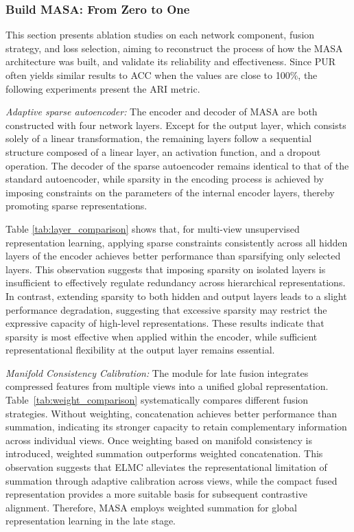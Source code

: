 \documentclass[10pt, journal, compsoc]{IEEEtran}
\begin{document}

\subsubsection{Build MASA: From Zero to One}
This section presents ablation studies on each network component, fusion strategy, and loss selection, aiming to reconstruct the process of how the MASA architecture was built, and validate its reliability and effectiveness. Since PUR often yields similar results to ACC when the values are close to 100\%, the following experiments present the ARI metric.

\textcolor{c1}{\textit{Adaptive sparse autoencoder:}} The encoder and decoder of MASA are both constructed with four network layers. Except for the output layer, which consists solely of a linear transformation, the remaining layers follow a sequential structure composed of a linear layer, an activation function, and a dropout operation. The decoder of the sparse autoencoder remains identical to that of the standard autoencoder, while sparsity in the encoding process is achieved by imposing constraints on the parameters of the internal encoder layers, thereby promoting sparse representations.


Table \ref{tab:layer_comparison} shows that, for multi-view unsupervised representation learning, applying sparse constraints consistently across all hidden layers of the encoder achieves better performance than sparsifying only selected layers. This observation suggests that imposing sparsity on isolated layers is insufficient to effectively regulate redundancy across hierarchical representations. In contrast, extending sparsity to both hidden and output layers leads to a slight performance degradation, suggesting that excessive sparsity may restrict the expressive capacity of high-level representations. These results indicate that sparsity is most effective when applied within the encoder, while sufficient representational flexibility at the output layer remains essential.

\textcolor{c1}{\textit{Manifold Consistency Calibration:}} The module for late fusion integrates compressed features from multiple views into a unified global representation. Table~\ref{tab:weight_comparison} systematically compares different fusion strategies. Without weighting, concatenation achieves better performance than summation, indicating its stronger capacity to retain complementary information across individual views. Once weighting based on manifold consistency is introduced, weighted summation outperforms weighted concatenation. This observation suggests that ELMC alleviates the representational limitation of summation through adaptive calibration across views, while the compact fused representation provides a more suitable basis for subsequent contrastive alignment. Therefore, MASA employs weighted summation for global representation learning in the late stage.
\end{document}
